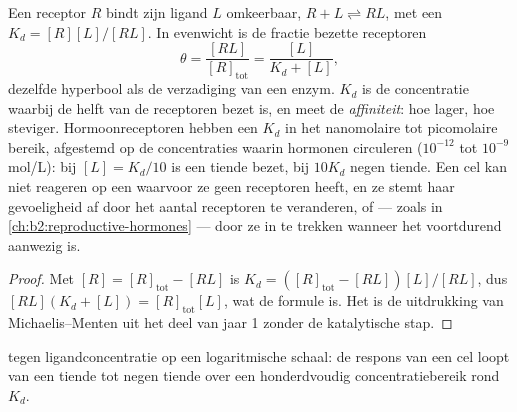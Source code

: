\begin{theorem}[Receptorbezetting]\label{thm:b2:cell-signalling:occupancy}
Een receptor $R$ bindt zijn ligand $L$ omkeerbaar, $R + L
\rightleftharpoons RL$, met een \emph{} $K_d =
[R][L]/[RL]$. In evenwicht is de fractie bezette receptoren
\[
\theta = \frac{[RL]}{[R]_{\text{tot}}} = \frac{[L]}{K_d + [L]},
\]
dezelfde hyperbool als de verzadiging van een enzym. $K_d$ is de
concentratie waarbij de helft van de receptoren bezet is, en meet de
\emph{affiniteit}: hoe lager, hoe steviger. Hormoonreceptoren hebben een
$K_d$ in het nanomolaire tot picomolaire bereik, afgestemd op de
concentraties waarin hormonen circuleren ($10^{-12}$ tot
$10^{-9}$ mol/L): bij $[L] = K_d/10$ is een tiende bezet, bij
$10K_d$ negen tiende. Een cel kan niet reageren op een  waarvoor ze
geen receptoren heeft, en ze stemt haar gevoeligheid af door het aantal
receptoren te veranderen, of --- zoals in \cref{ch:b2:reproductive-hormones}
--- door ze in te trekken wanneer het  voortdurend aanwezig is.
\end{theorem}
\begin{proof}
Met $[R] = [R]_{\text{tot}} - [RL]$ is $K_d = ([R]_{\text{tot}} -
[RL])[L]/[RL]$, dus $[RL](K_d + [L]) = [R]_{\text{tot}}[L]$, wat de
formule is. Het is de uitdrukking van Michaelis--Menten uit het deel van
jaar 1 zonder de katalytische stap.
\end{proof}

\begin{omfigure}

{\small {} tegen ligandconcentratie op een logaritmische
schaal: de respons van een cel loopt van een tiende tot negen tiende over
een honderdvoudig concentratiebereik rond $K_d$.}
\end{omfigure}

